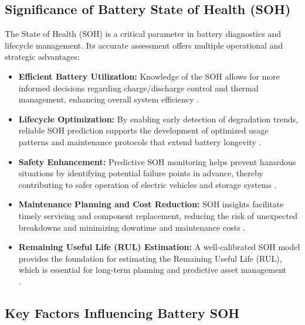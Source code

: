 \subsection*{Significance of Battery State of Health (SOH)}

The State of Health (SOH) is a critical parameter in battery diagnostics and lifecycle management. Its accurate assessment offers multiple operational and strategic advantages:

\begin{itemize}
    \item \textbf{Efficient Battery Utilization:} Knowledge of the SOH allows for more informed decisions regarding charge/discharge control and thermal management, enhancing overall system efficiency \cite{105207_1_5.0172683}.
    
    \item \textbf{Lifecycle Optimization:} By enabling early detection of degradation trends, reliable SOH prediction supports the development of optimized usage patterns and maintenance protocols that extend battery longevity \cite{electronics-13-01675}.
    
    \item \textbf{Safety Enhancement:} Predictive SOH monitoring helps prevent hazardous situations by identifying potential failure points in advance, thereby contributing to safer operation of electric vehicles and storage systems \cite{electronics-13-01675}.
    
    \item \textbf{Maintenance Planning and Cost Reduction:} SOH insights facilitate timely servicing and component replacement, reducing the risk of unexpected breakdowns and minimizing downtime and maintenance costs \cite{105207_1_5.0172683}.
    
    \item \textbf{Remaining Useful Life (RUL) Estimation:} A well-calibrated SOH model\\ provides the foundation for estimating the Remaining Useful Life (RUL), \\ which is essential for long-term planning and predictive asset management\\ \cite{wevj-12-00120-v2}.
\end{itemize}


\subsection*{Key Factors Influencing Battery SOH}

